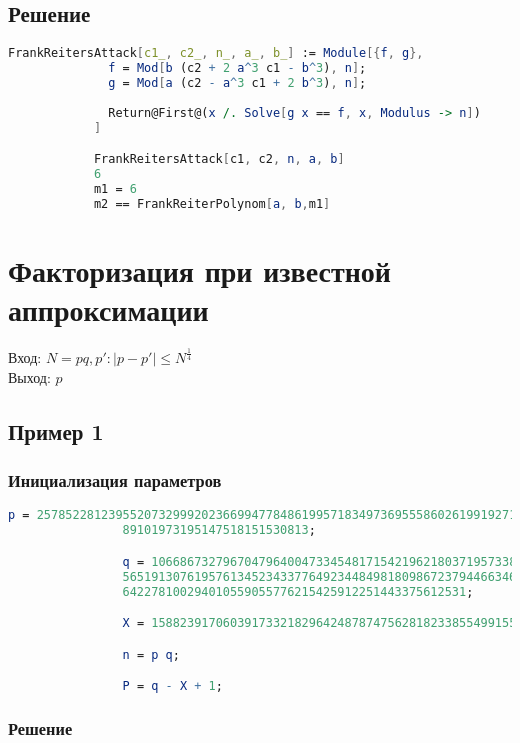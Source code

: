     	\subsection{Решение}

    		\begin{lstlisting}[language=Mathematica,caption={
	      		Решение
	    	}]
			FrankReitersAttack[c1_, c2_, n_, a_, b_] := Module[{f, g},
			  f = Mod[b (c2 + 2 a^3 c1 - b^3), n];
			  g = Mod[a (c2 - a^3 c1 + 2 b^3), n];
			  
			  Return@First@(x /. Solve[g x == f, x, Modulus -> n])
			]

			FrankReitersAttack[c1, c2, n, a, b]
			6
			m1 = 6
			m2 == FrankReiterPolynom[a, b,m1]
	    	\end{lstlisting}

	\section{Факторизация при известной аппроксимации}
		Вход: {$ N = p q, p': |p-p'| \le N^\frac{1}{4} $} \\   
  		Выход: {$p$}  

  		\subsection{Пример 1}

	  		\subsubsection{Инициализация параметров}

	  			\begin{lstlisting}[language=Mathematica,caption={
		      		Инициализация параметров
		    	}]
				p = 25785228123955207329992023669947784861995718349736955586026199192716446882\
				89101973195147518151530813;

				q = 10668673279670479640047334548171542196218037195733888904249796125333457239\
				565191307619576134523433776492344849818098672379446634699745951851743235009385\
				642278100294010559055776215425912251443375612531;

				X = 158823917060391733218296424878747562818233855499155999;

				n = p q;

				P = q - X + 1;
		    	\end{lstlisting}

	    	\subsubsection{Решение}

